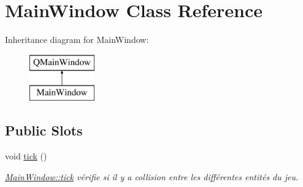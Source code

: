 \hypertarget{class_main_window}{}\section{Main\+Window Class Reference}
\label{class_main_window}
Inheritance diagram for Main\+Window\+:\begin{figure}[H]
\begin{center}
\leavevmode
\includegraphics[height=2.000000cm]{class_main_window}
\end{center}
\end{figure}
\subsection*{Public Slots}
\begin{DoxyCompactItemize}
\item 
\hypertarget{class_main_window_a48965b8c40edf53d61e2d41977c1566d}{}void \hyperlink{class_main_window_a48965b8c40edf53d61e2d41977c1566d}{tick} ()\label{class_main_window_a48965b8c40edf53d61e2d41977c1566d}

\begin{DoxyCompactList}\small\item\em \hyperlink{class_main_window_a48965b8c40edf53d61e2d41977c1566d}{Main\+Window\+::tick} vérifie si il y a collision entre les différentes entités du jeu. \end{DoxyCompactList}\end{DoxyCompactItemize}
